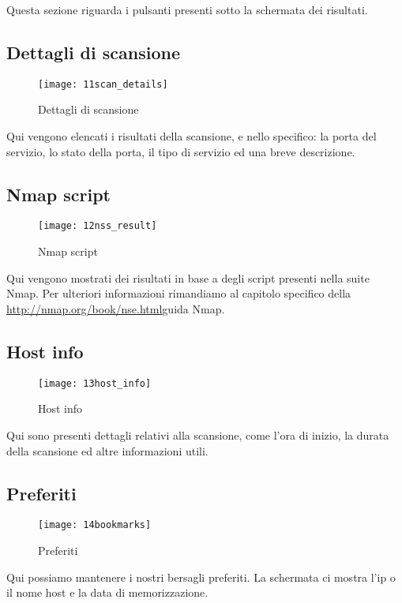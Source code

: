 Questa sezione riguarda i pulsanti presenti sotto la schermata dei risultati.

\subsection{Dettagli di scansione}
\label{sec:ContentsScanDetails}

\begin{figure}[h]
  \centering
  \texttt{[image: 11scan\_details]}
  \caption{Dettagli di scansione}
  \label{fig:ScanDetails}
\end{figure}
Qui vengono elencati i risultati della scansione, e nello specifico: la porta 
del servizio, lo stato della porta, il tipo di servizio ed una breve descrizione.

\subsection{Nmap script}
\label{sec:NmapScript}

\begin{figure}[h]
  \centering
  \texttt{[image: 12nss\_result]}
  \caption{Nmap script}
  \label{fig:NmapScript}
\end{figure}
Qui vengono mostrati dei risultati in base a degli script presenti nella suite 
Nmap. Per ulteriori informazioni rimandiamo al capitolo specifico della 
\url{http://nmap.org/book/nse.html}{guida Nmap}.

\subsection{Host info}
\label{sec:HostInfo}

\begin{figure}[h]
  \centering
  \texttt{[image: 13host\_info]}
  \caption{Host info}
  \label{fig:HostInfo}
\end{figure}
Qui sono presenti dettagli relativi alla scansione, come l'ora di inizio, la 
durata della scansione ed altre informazioni utili.

\subsection{Preferiti}
\label{sec:Bookmarks}

\begin{figure}[h]
  \centering
  \texttt{[image: 14bookmarks]}
  \caption{Preferiti}
  \label{fig:Bookmarks}
\end{figure}
Qui possiamo mantenere i nostri bersagli preferiti. La schermata ci mostra l'ip 
o il nome host e la data di memorizzazione.

